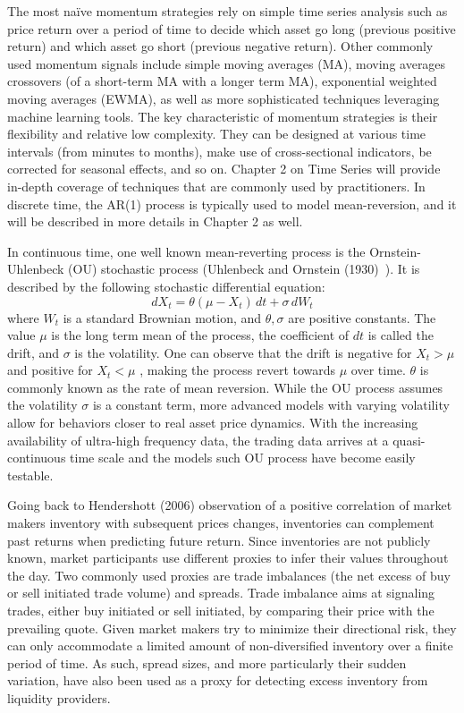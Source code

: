 The most na\"ive momentum strategies rely on simple time series analysis such as price return over a period of time to decide which asset go long (previous positive return) and which asset go short (previous negative return). Other commonly used momentum signals include simple moving averages (MA), moving averages crossovers (of a short-term MA with a longer term MA), exponential weighted moving averages  (EWMA), as well as more sophisticated techniques leveraging machine learning tools. The key characteristic of momentum strategies is their flexibility and relative low complexity. They can be designed at various time intervals (from minutes to months), make use of cross-sectional indicators, be corrected for seasonal effects, and so on. Chapter 2 on Time Series will provide in-depth coverage of techniques that are commonly used by practitioners. In discrete time, the AR(1) process is typically used to model mean-reversion, and it will be described in more details in Chapter 2 as well. 


In continuous time, one well known mean-reverting process is the Ornstein-Uhlenbeck (OU) stochastic process (Uhlenbeck and Ornstein (1930)~\cite{uhlenbeck}). It is described by the following stochastic differential equation:
	\begin{equation}\label{eqn:dxttheta}
	 dX_t = \theta(\mu - X_t)\,dt + \sigma \, dW_t 
	\end{equation}
where $W_t$ is a standard Brownian motion, and $\theta, \sigma$ are positive constants. The value $\mu$ is the long term mean of the process, the coefficient of $dt$ is called the drift, and $\sigma$ is the volatility. One can observe that the drift is negative for $X_t > \mu$ and positive for $X_t < \mu$ , making the process revert towards $\mu$ over time. $\theta$ is commonly known as the rate of mean reversion. While the OU process assumes the volatility $\sigma$ is a constant term, more advanced models with varying volatility allow for behaviors closer to real asset price dynamics. With the increasing availability of ultra-high frequency data, the trading data arrives at a quasi-continuous time scale and the models such OU process have become easily testable.


Going back to Hendershott (2006) observation of a positive correlation of market makers inventory with subsequent prices changes, inventories can complement past returns when predicting future return. Since inventories are not publicly known, market participants use different proxies to infer their values throughout the day. Two commonly used proxies are trade imbalances (the net excess of buy or sell initiated trade volume) and spreads. Trade imbalance aims at signaling trades, either buy initiated or sell initiated, by comparing their price with the prevailing quote. Given market makers try to minimize their directional risk, they can only accommodate a limited amount of non-diversified inventory over a finite period of time. As such, spread sizes, and more particularly their sudden variation, have also been used as a proxy for detecting excess inventory from liquidity providers.


